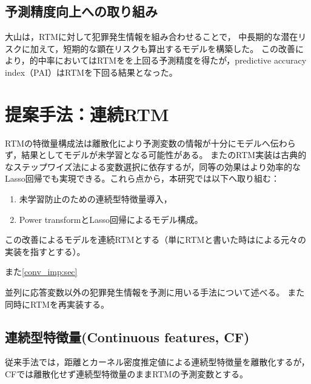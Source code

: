 \subsection{予測精度向上への取り組み}
大山\cite{大山智也2020日本}は，RTMに対して犯罪発生情報を組み合わせることで，
中長期的な潜在リスクに加えて，短期的な顕在リスクも算出するモデルを構築した。
この改善により，的中率においてはRTMをを上回る予測精度を得たが，predictive accuracy index（PAI）はRTMを下回る結果となった。

\section{提案手法：連続RTM}
\label{chapter_3}
RTMの特徴量構成法は離散化により予測変数の情報が十分にモデルへ伝わらず，結果としてモデルが未学習となる可能性がある。
また\citet{caplan2015risk}のRTM実装は古典的なステップワイズ法\cite{islp}による変数選択に依存するが，同等の効果はより効率的なLasso回帰\cite{Lasso}でも実現できる。これら点から，本研究では以下へ取り組む：
\begin{enumerate}
  \item 未学習防止のための連続型特徴量導入，
  \item Power transformとLasso回帰によるモデル構成。
\end{enumerate}
この改善によるモデルを連続RTMとする（単にRTMと書いた時は\citet{caplan2015risk}による元々の実装を指すとする）。

また\cref{conv_imp:sec}

並列に応答変数以外の犯罪発生情報を予測に用いる手法について述べる。
また同時にRTM\cite{caplan2015risk}を再実装する。

\subsection{連続型特徴量(Continuous features, CF)}
従来手法\cite{caplan2015risk}では，距離とカーネル密度推定値による連続型特徴量を離散化するが，
CFでは離散化せず連続型特徴量のままRTMの予測変数とする。
